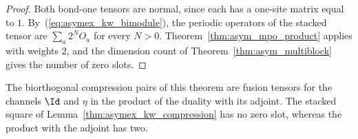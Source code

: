 \begin{proof}
    \leanok
    Both bond-one tensors are normal, since each has a one-site matrix
    equal to $1$. By~(\ref{eq:asymex_kw_bimodule}), the periodic
    operators of the stacked tensor are $\sum_a2^NO_a$ for every $N>0$.
    Theorem~\ref{thm:asym_mpo_product} applies with weights $2$, and the
    dimension count of Theorem~\ref{thm:asym_multiblock} gives the number
    of zero slots.
\end{proof}

The biorthogonal compression pairs of this theorem are fusion tensors
for the channels $\Id$ and $\eta$ in the product of the duality with
its adjoint. The stacked square of Lemma~\ref{thm:asymex_kw_compression}
has no zero slot, whereas the product with the adjoint has two.
